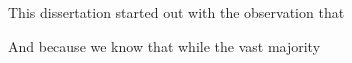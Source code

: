 This dissertation started out with the observation that 

And because we know that while the vast majority  




%